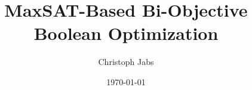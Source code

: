 \documentclass[english,twoside,censored,csm,algorithms-track-2020]{HYthesisML}
\title{MaxSAT-Based Bi-Objective Boolean Optimization}
\author{Christoph Jabs}
\date{\today}
\begin{document}
\maketitle






\mytableofcontents

\mainmatter









{}  %
\printbibliography

\backmatter
\begin{appendices}



\end{appendices}
\end{document}
